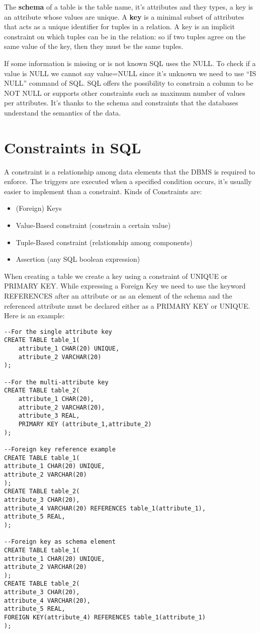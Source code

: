 \documentclass[a4page, 11pt]{article}
\begin{document}
The \textbf{schema} of a table is the table name, it's attributes and they types, a key is an attribute whose values are unique. A \textbf{key} is a minimal subset of attributes that acts as a unique identifier for tuples in a relation. A key is an implicit constraint on which tuples can be in the relation: so if two tuples agree on the same value of the key, then they must be the same tuples. 

If some information is missing or is not known SQL uses the NULL. To check if a value is NULL we cannot say value=NULL since it's unknown we need to use ``IS NULL'' command of SQL. SQL offers the possibility to constrain a column to be NOT NULL or supports other constraints such as maximum number of values per attributes.
It's thanks to the schema and constraints that the databases understand the semantics of the data.

\section{Constraints in SQL}
A constraint is a relationship among data elements that the DBMS is required to enforce. The triggers are executed when a specified condition occurs, it's usually easier to implement than a constraint. 
Kinds of Constraints are:
\begin{itemize}[noitemsep]
	\item (Foreign) Keys
	\item Value-Based constraint (constrain a certain value)
	\item Tuple-Based constraint (relationship among components)
	\item Assertion (any SQL boolean expression)
\end{itemize}
When creating a table we create a key using a constraint of UNIQUE or PRIMARY KEY. While expressing a Foreign Key we need to use the keyword REFERENCES after an attribute or as an element of the schema and the referenced attribute must be declared either as a PRIMARY KEY or UNIQUE. Here is an example:
\begin{lstlisting}
--For the single attribute key
CREATE TABLE table_1(
	attribute_1 CHAR(20) UNIQUE,
	attribute_2 VARCHAR(20)
);

--For the multi-attribute key
CREATE TABLE table_2(
	attribute_1 CHAR(20),
	attribute_2 VARCHAR(20),
	attribute_3 REAL,
	PRIMARY KEY (attribute_1,attribute_2)
);

--Foreign key reference example
CREATE TABLE table_1(
attribute_1 CHAR(20) UNIQUE,
attribute_2 VARCHAR(20)
);
CREATE TABLE table_2(
attribute_3 CHAR(20),
attribute_4 VARCHAR(20) REFERENCES table_1(attribute_1),
attribute_5 REAL,
);

--Foreign key as schema element
CREATE TABLE table_1(
attribute_1 CHAR(20) UNIQUE,
attribute_2 VARCHAR(20)
);
CREATE TABLE table_2(
attribute_3 CHAR(20),
attribute_4 VARCHAR(20),
attribute_5 REAL,
FOREIGN KEY(attribute_4) REFERENCES table_1(attribute_1)
);
\end{lstlisting}
\end{document}
